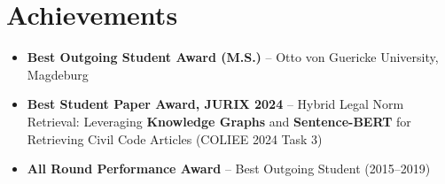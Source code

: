 \documentclass[a4paper,11pt]{article}
\begin{document}
\vspace{-2mm}

\section{Achievements}
\begin{itemize}[leftmargin=3ex, rightmargin=2ex, noitemsep, labelsep=1.2mm, itemsep=0.7mm]\small
  \item \textbf{Best Outgoing Student Award (M.S.)} -- Otto von Guericke University, Magdeburg
  \item \textbf{Best Student Paper Award, JURIX 2024} -- Hybrid Legal Norm Retrieval: Leveraging \textbf{Knowledge Graphs} and \textbf{Sentence-BERT} for Retrieving Civil Code Articles (COLIEE 2024 Task 3)
  \item \textbf{All Round Performance Award} -- Best Outgoing Student (2015--2019)
\end{itemize}
\end{document}
